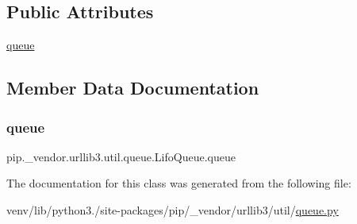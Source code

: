 \subsection*{Public Attributes}
\begin{DoxyCompactItemize}
\item 
\hyperlink{classpip_1_1__vendor_1_1urllib3_1_1util_1_1queue_1_1LifoQueue_a340eb5ed6fd63ae0ecaf7a16d2fee4cc}{queue}
\end{DoxyCompactItemize}


\subsection{Member Data Documentation}
\mbox{\label{classpip_1_1__vendor_1_1urllib3_1_1util_1_1queue_1_1LifoQueue_a340eb5ed6fd63ae0ecaf7a16d2fee4cc}} 
\subsubsection{\texorpdfstring{queue}{queue}}
{\footnotesize\ttfamily pip.\+\_\+vendor.\+urllib3.\+util.\+queue.\+Lifo\+Queue.\+queue}



The documentation for this class was generated from the following file\+:\begin{DoxyCompactItemize}
\item 
venv/lib/python3./site-\/packages/pip/\+\_\+vendor/urllib3/util/\hyperlink{queue_8py}{queue.\+py}\end{DoxyCompactItemize}
